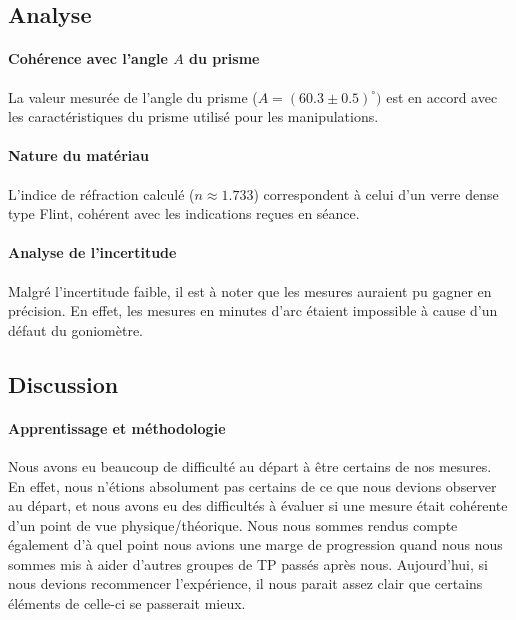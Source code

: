 \subsection{Analyse}

\paragraph{Cohérence avec l'angle $A$ du prisme} 
La valeur mesurée de l'angle du prisme ($A = (60.3 \pm 0.5)^{\circ})$
est en accord avec les caractéristiques du prisme utilisé pour les manipulations. 

\paragraph{Nature du matériau}
L'indice de réfraction calculé ($n \approx 1.733$) correspondent à celui d'un verre dense type Flint, 
cohérent avec les indications reçues en séance. 

\paragraph{Analyse de l'incertitude}
Malgré l'incertitude faible, il est à noter que les mesures auraient pu gagner en précision. 
En effet, les mesures en minutes d'arc étaient impossible à cause d'un défaut du goniomètre. 

\subsection{Discussion}

\paragraph{Apprentissage et méthodologie}
Nous avons eu beaucoup de difficulté au départ à être certains de nos mesures. 
En effet, nous n'étions absolument pas certains de ce que nous devions observer au départ, 
et nous avons eu des difficultés à évaluer si une mesure était cohérente 
d'un point de vue physique/théorique. 
Nous nous sommes rendus compte également d'à quel point nous avions une marge de progression
quand nous nous sommes mis à aider d'autres groupes de TP passés après nous. 
Aujourd'hui, si nous devions recommencer l'expérience, 
il nous parait assez clair que certains éléments de celle-ci se passerait mieux. 

